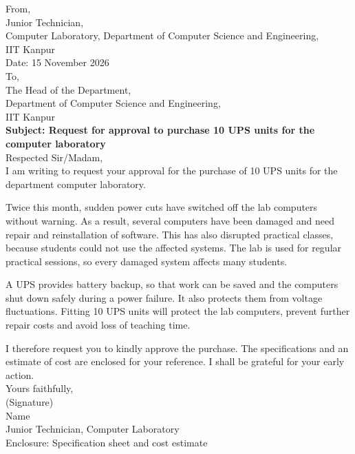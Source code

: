 \documentclass[11pt,a4paper]{article}
\begin{document}
\begin{shaded}
\small
From,\\
Junior Technician,\\
Computer Laboratory, Department of Computer Science and Engineering,\\
IIT Kanpur\\[3pt]
Date: 15 November 2026\\[6pt]
To,\\
The Head of the Department,\\
Department of Computer Science and Engineering,\\
IIT Kanpur\\[6pt]
\textbf{Subject: Request for approval to purchase 10 UPS units for the computer laboratory}\\[6pt]
Respected Sir/Madam,\\[4pt]
I am writing to request your approval for the purchase of 10 UPS units for the department computer laboratory.

Twice this month, sudden power cuts have switched off the lab computers without warning. As a result, several computers have been damaged and need repair and reinstallation of software. This has also disrupted practical classes, because students could not use the affected systems. The lab is used for regular practical sessions, so every damaged system affects many students.

A UPS provides battery backup, so that work can be saved and the computers shut down safely during a power failure. It also protects them from voltage fluctuations. Fitting 10 UPS units will protect the lab computers, prevent further repair costs and avoid loss of teaching time.

I therefore request you to kindly approve the purchase. The specifications and an estimate of cost are enclosed for your reference. I shall be grateful for your early action.\\[6pt]
Yours faithfully,\\
(Signature)\\
Name\\
Junior Technician, Computer Laboratory\\[3pt]
Enclosure: Specification sheet and cost estimate
\end{shaded}
\end{document}
